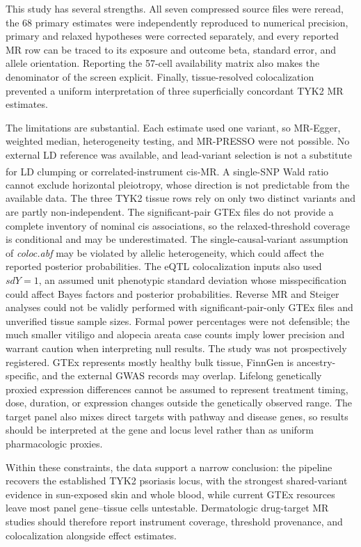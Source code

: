 This study has several strengths. All seven compressed source files were reread, the 68 primary estimates were independently reproduced to numerical precision, primary and relaxed hypotheses were corrected separately, and every reported MR row can be traced to its exposure and outcome beta, standard error, and allele orientation. Reporting the 57-cell availability matrix also makes the denominator of the screen explicit. Finally, tissue-resolved colocalization prevented a uniform interpretation of three superficially concordant TYK2 MR estimates.

The limitations are substantial. Each estimate used one variant, so MR-Egger, weighted median, heterogeneity testing, and MR-PRESSO were not possible. No external LD reference was available, and lead-variant selection is not a substitute for LD clumping or correlated-instrument cis-MR.\textsuperscript{\cite{gkatzionis2022cismr,lin2024cismr}} A single-SNP Wald ratio cannot exclude horizontal pleiotropy, whose direction is not predictable from the available data. The three TYK2 tissue rows rely on only two distinct variants and are partly non-independent. The significant-pair GTEx files do not provide a complete inventory of nominal cis associations, so the relaxed-threshold coverage is conditional and may be underestimated. The single-causal-variant assumption of \textit{coloc.abf} may be violated by allelic heterogeneity, which could affect the reported posterior probabilities. The eQTL colocalization inputs also used $sdY=1$, an assumed unit phenotypic standard deviation whose misspecification could affect Bayes factors and posterior probabilities. Reverse MR and Steiger analyses could not be validly performed with significant-pair-only GTEx files and unverified tissue sample sizes. Formal power percentages were not defensible; the much smaller vitiligo and alopecia areata case counts imply lower precision and warrant caution when interpreting null results. The study was not prospectively registered. GTEx represents mostly healthy bulk tissue, FinnGen is ancestry-specific, and the external GWAS records may overlap. Lifelong genetically proxied expression differences cannot be assumed to represent treatment timing, dose, duration, or expression changes outside the genetically observed range. The target panel also mixes direct targets with pathway and disease genes, so results should be interpreted at the gene and locus level rather than as uniform pharmacologic proxies.

Within these constraints, the data support a narrow conclusion: the pipeline recovers the established TYK2 psoriasis locus, with the strongest shared-variant evidence in sun-exposed skin and whole blood, while current GTEx resources leave most panel gene--tissue cells untestable. Dermatologic drug-target MR studies should therefore report instrument coverage, threshold provenance, and colocalization alongside effect estimates.
